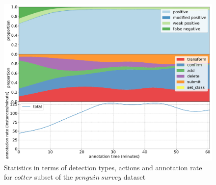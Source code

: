 \begin{figure}[!h]
\centering
\includegraphics[width=1.0\linewidth]{charts/aerial_penguins/action_annotations/cotter_a.pdf}
\caption{Statistics in terms of detection types, actions and annotation rate for $cotter$ subset of the $penguin\:survey$ dataset}
\label{fig:cotter_annotation}
\end{figure}


